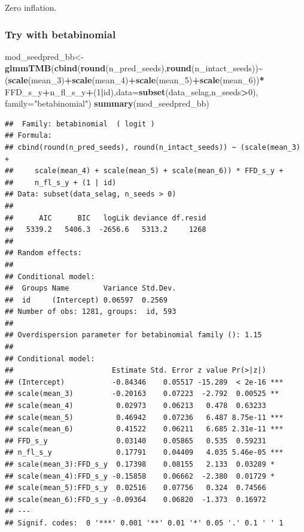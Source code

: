\documentclass[
]{article}
\newenvironment{Shaded}{\begin{snugshade}}{\end{snugshade}}
\newcommand{\DataTypeTok}[1]{\textcolor[rgb]{0.13,0.29,0.53}{#1}}
\newcommand{\DecValTok}[1]{\textcolor[rgb]{0.00,0.00,0.81}{#1}}
\newcommand{\KeywordTok}[1]{\textcolor[rgb]{0.13,0.29,0.53}{\textbf{#1}}}
\newcommand{\NormalTok}[1]{#1}
\newcommand{\OperatorTok}[1]{\textcolor[rgb]{0.81,0.36,0.00}{\textbf{#1}}}
\newcommand{\StringTok}[1]{\textcolor[rgb]{0.31,0.60,0.02}{#1}}
\begin{document}
Zero inflation.

\hypertarget{try-with-betabinomial-1}{%
\subsubsection{Try with betabinomial}\label{try-with-betabinomial-1}}

\begin{Shaded}
\begin{Highlighting}[]
\NormalTok{mod\_seedpred\_bb\textless{}{-}}\KeywordTok{glmmTMB}\NormalTok{(}\KeywordTok{cbind}\NormalTok{(}\KeywordTok{round}\NormalTok{(n\_pred\_seeds),}\KeywordTok{round}\NormalTok{(n\_intact\_seeds))}\OperatorTok{\textasciitilde{}}
\StringTok{                     }\NormalTok{(}\KeywordTok{scale}\NormalTok{(mean\_}\DecValTok{3}\NormalTok{)}\OperatorTok{+}\KeywordTok{scale}\NormalTok{(mean\_}\DecValTok{4}\NormalTok{)}\OperatorTok{+}\KeywordTok{scale}\NormalTok{(mean\_}\DecValTok{5}\NormalTok{)}\OperatorTok{+}\KeywordTok{scale}\NormalTok{(mean\_}\DecValTok{6}\NormalTok{))}\OperatorTok{*}
\StringTok{                      }\NormalTok{FFD\_s\_y}\OperatorTok{+}\NormalTok{n\_fl\_s\_y}\OperatorTok{+}\NormalTok{(}\DecValTok{1}\OperatorTok{|}\NormalTok{id),}\DataTypeTok{data=}\KeywordTok{subset}\NormalTok{(data\_selag,n\_seeds}\OperatorTok{\textgreater{}}\DecValTok{0}\NormalTok{),}
                    \DataTypeTok{family=}\StringTok{"betabinomial"}\NormalTok{)}
\KeywordTok{summary}\NormalTok{(mod\_seedpred\_bb)}
\end{Highlighting}
\end{Shaded}

\begin{verbatim}
##  Family: betabinomial  ( logit )
## Formula:          
## cbind(round(n_pred_seeds), round(n_intact_seeds)) ~ (scale(mean_3) +  
##     scale(mean_4) + scale(mean_5) + scale(mean_6)) * FFD_s_y +  
##     n_fl_s_y + (1 | id)
## Data: subset(data_selag, n_seeds > 0)
## 
##      AIC      BIC   logLik deviance df.resid 
##   5339.2   5406.3  -2656.6   5313.2     1268 
## 
## Random effects:
## 
## Conditional model:
##  Groups Name        Variance Std.Dev.
##  id     (Intercept) 0.06597  0.2569  
## Number of obs: 1281, groups:  id, 593
## 
## Overdispersion parameter for betabinomial family (): 1.15 
## 
## Conditional model:
##                       Estimate Std. Error z value Pr(>|z|)    
## (Intercept)           -0.84346    0.05517 -15.289  < 2e-16 ***
## scale(mean_3)         -0.20163    0.07223  -2.792  0.00525 ** 
## scale(mean_4)          0.02973    0.06213   0.478  0.63233    
## scale(mean_5)          0.46942    0.07236   6.487 8.75e-11 ***
## scale(mean_6)          0.41522    0.06211   6.685 2.31e-11 ***
## FFD_s_y                0.03140    0.05865   0.535  0.59231    
## n_fl_s_y               0.17791    0.04409   4.035 5.46e-05 ***
## scale(mean_3):FFD_s_y  0.17398    0.08155   2.133  0.03289 *  
## scale(mean_4):FFD_s_y -0.15858    0.06662  -2.380  0.01729 *  
## scale(mean_5):FFD_s_y  0.02516    0.07756   0.324  0.74566    
## scale(mean_6):FFD_s_y -0.09364    0.06820  -1.373  0.16972    
## ---
## Signif. codes:  0 '***' 0.001 '**' 0.01 '*' 0.05 '.' 0.1 ' ' 1
\end{verbatim}
\end{document}
